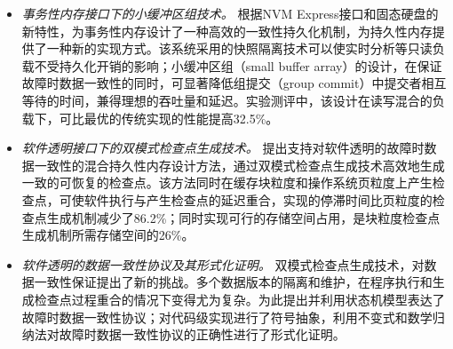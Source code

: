 \begin{cabstract}
\begin{itemize}
\item \emph{事务性内存接口下的小缓冲区组技术。}
根据NVM Express接口和固态硬盘的新特性，为事务性内存设计了一种高效的一致性持久化机制，为持久性内存提供了一种新的实现方式。该系统采用的快照隔离技术可以使实时分析等只读负载不受持久化开销的影响；小缓冲区组（small buffer array）的设计，在保证故障时数据一致性的同时，可显著降低组提交（group commit）中提交者相互等待的时间，兼得理想的吞吐量和延迟。实验测评中，该设计在读写混合的负载下，可比最优的传统实现的性能提高32.5\%。

\item \emph{软件透明接口下的双模式检查点生成技术。}
提出支持对软件透明的故障时数据一致性的混合持久性内存设计方法，通过双模式检查点生成技术高效地生成一致的可恢复的检查点。该方法同时在缓存块粒度和操作系统页粒度上产生检查点，可使软件执行与产生检查点的延迟重合，实现的停滞时间比页粒度的检查点生成机制减少了86.2\%；同时实现可行的存储空间占用，是块粒度检查点生成机制所需存储空间的26\%。

\item \emph{软件透明的数据一致性协议及其形式化证明。}
双模式检查点生成技术，对数据一致性保证提出了新的挑战。多个数据版本的隔离和维护，在程序执行和生成检查点过程重合的情况下变得尤为复杂。为此提出并利用状态机模型表达了故障时数据一致性协议；对代码级实现进行了符号抽象，利用不变式和数学归纳法对故障时数据一致性协议的正确性进行了形式化证明。
\end{itemize}

\end{cabstract}


